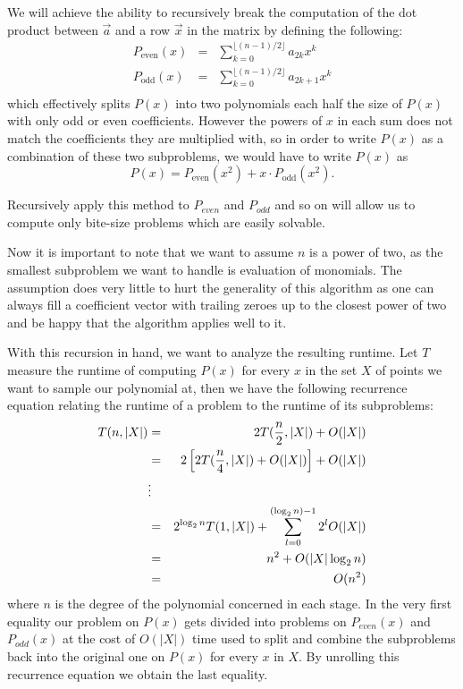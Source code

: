 \documentclass[../article.tex]{subfiles}
\begin{document}
We will achieve the ability to recursively break the computation of the dot product between $\vec{a}$ and a row $\vec{x}$ in the matrix by defining the following:
\begin{eqnarray*}
P_{\text{even}}(x)&=&\displaystyle \sum_{k=0}^{\lfloor(n-1)/2\rfloor} a_{2k}x^k\\
P_{\text{odd}}(x)&=&\displaystyle \sum_{k=0}^{\lfloor(n-1)/2\rfloor} a_{2k+1}x^k\\
\end{eqnarray*}
which effectively splits $P(x)$ into two polynomials each half the size of $P(x)$ with only odd or even coefficients. However the powers of $x$ in each sum does not match the coefficients they are multiplied with, so in order to write $P(x)$ as a combination of these two subproblems, we would have to write $P(x)$ as
\begin{equation}\label{split}
P(x) = P_{\text{even}}(x^2)+x\cdot P_{\text{odd}}(x^2).
\end{equation}

Recursively apply this method to $P_{even}$ and $P_{odd}$ and so on will allow us to compute only bite-size problems which are easily solvable.

Now it is important to note that we want to assume $n$ is a power of two, as the smallest subproblem we want to handle is evaluation of monomials. The assumption does very little to hurt the generality of this algorithm as one can always fill a coefficient vector with trailing zeroes up to the closest power of two and be happy that the algorithm applies well to it.

With this recursion in hand, we want to analyze the resulting runtime. Let $T$ measure the runtime of computing $P(x)$ for every $x$ in the set $X$ of points we want to sample our polynomial at, then we have the following recurrence equation relating the runtime of a problem to the runtime of its subproblems:
\begin{eqnarray}
	T(n,|X|) &=& 2T(\frac{n}{2}, |X|) + O(|X|)\notag\\
	&=& 2\left[2T(\frac{n}{4}, |X|)+O(|X|)\right]+O(|X|)\notag\\
	&\vdots&\notag\\
	&=& 2^{\log_2{n}}T(1,|X|)+\sum_{l=0}^{(\log_2{n})-1}2^lO(|X|) \label{recurrence}\\
	&=& n^2+O(|X|\log_2{n})\notag\\
	&=& O(n^2)\notag
\end{eqnarray}
where $n$ is the degree of the polynomial concerned in each stage. In the very first equality our problem on $P(x)$ gets divided into problems on $P_{even}(x)$ and $P_{odd}(x)$ at the cost of $O(|X|)$ time used to split and combine the subproblems back into the original one on $P(x)$ for every $x$ in $X$. By unrolling this recurrence equation we obtain the last equality.
\end{document}

